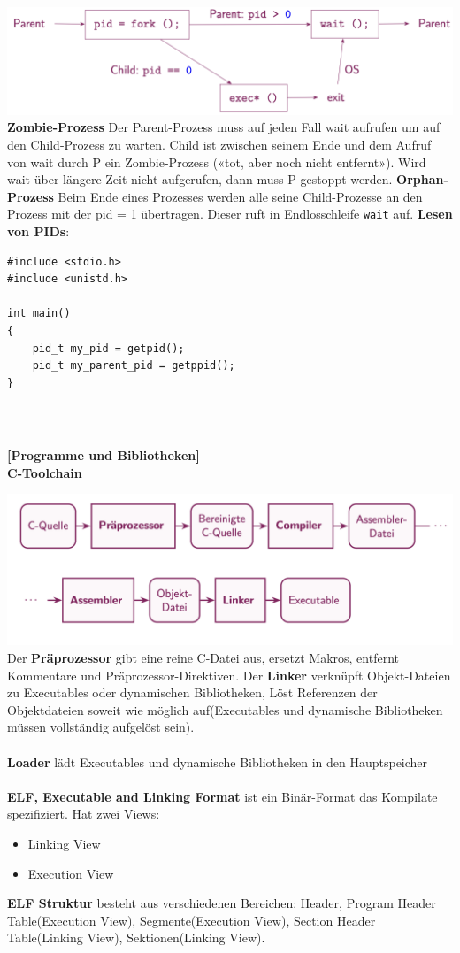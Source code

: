 \documentclass[8pt]{extarticle}
\let\oldtextbf\textbf
\renewcommand{\textbf}{\tiny\oldtextbf}
\begin{document}
\begin{multicols*}{5}
	\includegraphics[scale=0.299]{Prozesse.png}
	\textbf{Zombie-Prozess} Der Parent-Prozess muss auf jeden Fall wait aufrufen um auf den Child-Prozess zu warten. Child ist zwischen seinem Ende und dem Aufruf von wait durch P ein Zombie-Prozess («tot, aber noch nicht entfernt»). Wird wait über längere Zeit nicht aufgerufen, dann muss P gestoppt werden.
	\textbf{Orphan-Prozess}
	Beim Ende eines Prozesses werden alle seine Child-Prozesse an den Prozess mit der pid = 1 übertragen. Dieser ruft in Endlosschleife \texttt{wait} auf.
	\textbf{Lesen von PIDs}:
	\begin{lstlisting}
#include <stdio.h>
#include <unistd.h>

int main()
{
    pid_t my_pid = getpid();
    pid_t my_parent_pid = getppid();
}
	\end{lstlisting}\
			
	\rule{\linewidth}{0.4pt}
	\textbf{[Programme und Bibliotheken]}\\
	\textbf{C-Toolchain}
		
	\includegraphics[scale=0.255]{C-Toolchain.png}
	Der \textbf{Präprozessor} gibt eine reine C-Datei aus, ersetzt Makros, entfernt Kommentare und Präprozessor-Direktiven. Der \textbf{Linker} verknüpft Objekt-Dateien zu Executables oder dynamischen Bibliotheken, Löst Referenzen der Objektdateien soweit wie möglich auf(Executables und dynamische Bibliotheken müssen vollständig aufgelöst sein).\\\\
	\textbf{Loader} lädt Executables und dynamische Bibliotheken in den Hauptspeicher\\\\
	\textbf{ELF, Executable and Linking Format} ist ein Binär-Format das Kompilate spezifiziert. Hat zwei Views:
	\begin{itemize} [noitemsep, topsep=0pt, leftmargin=*]
		\item Linking View
		\item Execution View
	\end{itemize}
	\vspace{5pt}
	\textbf{ELF Struktur} besteht aus verschiedenen Bereichen: Header, Program Header Table(Execution View), Segmente(Execution View), Section Header Table(Linking View), Sektionen(Linking View).
			

\end{multicols*}
\end{document}
